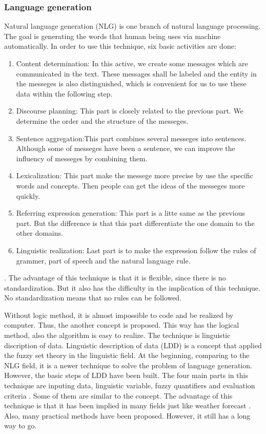 \subsubsection*{Language generation}

Natural language generation (NLG) is one branch of natural language processing. The goal is generating the words that human being uses via machine automatically. In order to use this technique, six basic activities are done: 

\begin{enumerate}
	\item Content determination: In this active, we create some messages which are communicated in the text. 
	These messages shall be labeled and the entity in the messeges is also distinguished, which is convenient for us to 
	use these data within the following step.
	\item Discourse planning: This part is closely related to the previous part. 
	We determine the order and the structure of the messeges.
	\item Sentence aggregation:This part combines several messeges into sentences. 
	Although some of messeges have been a sentence, we can improve the influency of messeges by combining them.
	\item Lexicalization: This part make the messege more precise by use the specific words and concepts. 
	Then people can get the ideas of the messeges more quickly.
	\item Referring expression generation: This part is a litte same as the previous part. 
	But the difference is that this part differentiate the one domain to the other domains.
	\item Linguistic realization: Last part is to make the expression follow the rules of grammer, part of speech and the natural language rule.
	
\end{enumerate}
\cite{aramossoto2016onthe}. The advantage of this technique is that it is flexible, since there is no standardization. But it also has the difficulty in the implication of this technique. \cite{aramossoto2016onthe} No standardization means that no rules can be followed. 

Without logic method, it is almost impossible to code and be realized by computer. 
Thus, the another concept is proposed. 
This way has the logical method, also the algorithm is easy to realize. 
The technique is linguistic discription of data.
Linguistic description of data (LDD) is a concept that applied the fuzzy set theory in the linguistic field. 
At the beginning, comparing to the NLG field, it is a newer technique to solve the problem of language generation. 
However, the basic steps of LDD have been built. 
The four main parts in this technique are inputing data, linguistic variable, fuzzy quantifiers and evaluation criteria \cite{aramossoto2016onthe}. 
Some of them are similar to the concept. 
The advantage of this technique is that it has been implied in many fields just like weather forecast \cite{Ramos-SotoBBT14}. 
Also, many practical methods have been proposed. However, it still has a long way to go.

